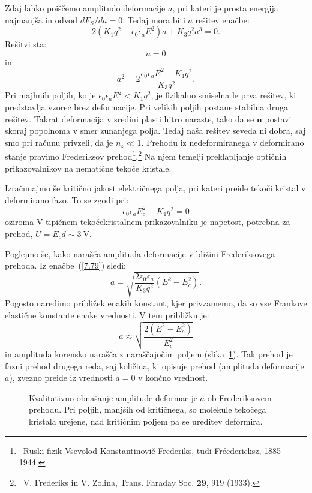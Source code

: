 Zdaj lahko poiščemo amplitudo deformacije $a$, pri kateri je prosta energija
najmanjša in odvod $dF_S/da=0$. Tedaj mora biti $a$ rešitev enačbe: 
\begin{equation}
2(K_{1}q^{2}-\epsilon_{0}\epsilon_{a}E^2)a+K_{3}q^{2}a^{3}=0.
\label{7.78}
\end{equation}
 Rešitvi sta:
\begin{equation}
a=0
\end{equation}
in
\begin{equation}
a^{2}=2\frac{\epsilon_{0}\epsilon_{a}E^2-K_{1}q^{2}}{K_{3}q^{2}}.
\label{7.79}
\end{equation}
 Pri majhnih poljih, ko je $\epsilon_{0}\epsilon_{a}E^2<K_{1}q^{2}$,
je fizikalno smiselna le prva rešitev, ki predstavlja vzorec brez deformacije. Pri 
velikih poljih postane stabilna druga rešitev. Takrat deformacija
v sredini plasti hitro naraste, tako da se $\mathbf{n}$ postavi skoraj
popolnoma v smer zunanjega polja. Tedaj naša rešitev seveda ni dobra,
saj smo pri računu privzeli, da je $n_{z}\ll1$. Prehodu iz nedeformiranega
v deformirano stanje pravimo  Frederiksov prehod\footnote{~Ruski fizik
Vsevolod Konstantinovič Frederiks, tudi Fr\'{e}edericksz, 1885--1944.}.\footnote{~V. Frederiks in V. Zolina, Trans. Faraday Soc. $\mathbf{29}$, 919 (1933).}  Na njem
temelji preklapljanje optičnih prikazovalnikov na nematične tekoče kristale.

Izračunajmo še kritično jakost električnega polja, pri kateri preide tekoči kristal v deformirano fazo.
To se zgodi pri:
\begin{equation}
\epsilon_{0}\epsilon_{a}E_c^2-K_{1}q^{2} = 0
\end{equation}
oziroma
V tipičnem tekočekristalnem prikazovalniku je napetost, potrebna za prehod, $U = E_cd \sim 3~\si{\volt}$. 

Poglejmo še, kako narašča amplituda deformacije v bližini Frederiksovega prehoda. Iz enačbe~(\ref{7.79}) sledi:
\begin{equation}
a = \sqrt{\frac{2 \varepsilon_0 \varepsilon_a}{K_3 q^2 }(E^2-E_c^2)}.
\end{equation}
Pogosto naredimo približek enakih konstant, kjer privzamemo, da so vse Frankove 
elastične konstante enake vrednosti. V tem približku je:
\begin{equation}
a \approx \sqrt{\frac{2(E^2-E_c^2)}{E_c^2}}
\end{equation}
in amplituda korensko narašča z naraščajočim poljem (slika~\ref{Fred}). Tak prehod je
fazni prehod drugega reda, saj količina, ki opisuje prehod (amplituda deformacije $a$),
zvezno preide iz vrednosti $a=0$ v končno vrednost. 
\begin{figure}[ht]
\centering
\def\svgwidth{70truemm} 

\caption{Kvalitativno obnašanje amplitude deformacije $a$ ob Frederiksovem prehodu. Pri poljih, 
manjših od kritičnega, so molekule tekočega kristala urejene, nad kritičnim poljem
pa se ureditev deformira.}
\label{Fred}
\end{figure}

